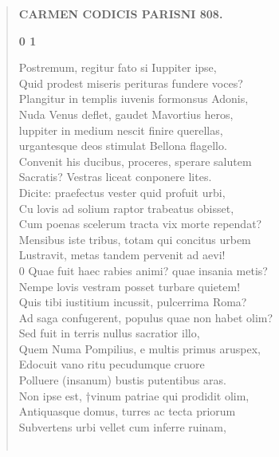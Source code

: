 \documentclass[11pt, a4paper]{report}
\begin{document}
\begin{verse}
    \begin{center} \textbf{CARMEN CODICIS PARISNI 808.} \end{center}\begin{center} \textbf{0 1} \end{center}Postremum, regitur fato si Iuppiter ipse, \\ Quid prodest miseris perituras fundere voces? \\ Plangitur in templis iuvenis formonsus Adonis, \\ Nuda Venus deflet, gaudet Mavortius heros, \\ luppiter in medium nescit finire querellas, \\ urgantesque deos stimulat Bellona flagello. \\ Convenit his ducibus, proceres, sperare salutem \\ Sacratis? Vestras liceat conponere lites. \\ Dicite: praefectus vester quid profuit urbi, \\ Cu lovis ad solium raptor trabeatus obisset, \\ Cum poenas scelerum tracta vix morte rependat? \\ Mensibus iste tribus, totam qui concitus urbem \\ Lustravit, metas tandem pervenit ad aevi! \\ 0 Quae fuit haec rabies animi? quae insania metis? \\ Nempe lovis vestram posset turbare quietem! \\ Quis tibi iustitium incussit, pulcerrima Roma? \\ Ad saga confugerent, populus quae non habet olim? \\ Sed fuit in terris nullus sacratior illo, \\ Quem Numa Pompilius, e multis primus aruspex, \\ Edocuit vano ritu pecudumque cruore \\ Polluere (insanum) bustis putentibus aras. \\ Non ipse est, †vinum patriae qui prodidit olim, \\ Antiquasque domus, turres ac tecta priorum \\ Subvertens urbi vellet cum inferre ruinam, \\ 
        ﻿\pagebreak 

\end{verse}
\end{document}
